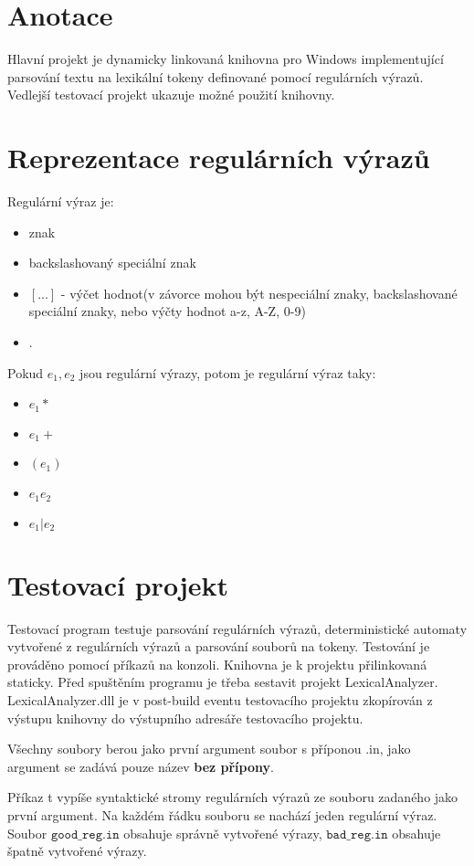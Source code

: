 \documentclass{article}
\begin{document}
 

\section{Anotace}
Hlavní projekt je dynamicky linkovaná knihovna pro Windows implementující parsování textu na lexikální tokeny definované pomocí regulárních výrazů. Vedlejší testovací projekt ukazuje možné použití knihovny.

\section{Reprezentace regulárních výrazů}
Regulární výraz je:
\begin{itemize}
	\item znak
	\item backslashovaný speciální znak
	\item $[...]$ - výčet hodnot(v závorce mohou být nespeciální znaky, backslashované speciální znaky, nebo výčty hodnot a-z, A-Z, 0-9)
	\item .
\end{itemize}
Pokud $e_1, e_2$ jsou regulární výrazy, potom je regulární výraz taky:
\begin{itemize}
	\item $e_1*$
	\item $e_1+$
	\item $(e_1)$
	\item $e_1e_2$
	\item $e_1|e_2$
\end{itemize}

\section{Testovací projekt}
Testovací program testuje parsování regulárních výrazů, deterministické automaty vytvořené z regulárních výrazů a parsování souborů na tokeny. Testování je prováděno pomocí příkazů na konzoli. Knihovna je k projektu přilinkovaná staticky. Před spuštěním programu je třeba sestavit projekt LexicalAnalyzer. LexicalAnalyzer.dll je v post-build eventu testovacího projektu zkopírován z výstupu knihovny do výstupního adresáře testovacího projektu. 

Všechny soubory berou jako první argument soubor s příponou .in, jako argument se zadává pouze název \textbf{bez přípony}.

Příkaz t vypíše syntaktické stromy regulárních výrazů ze souboru zadaného jako první argument. Na každém řádku souboru se nachází jeden regulární výraz. Soubor $\texttt{good\_reg.in}$ obsahuje správně vytvořené výrazy, $\texttt{bad\_reg.in}$ obsahuje špatně vytvořené výrazy. 
\end{document}
